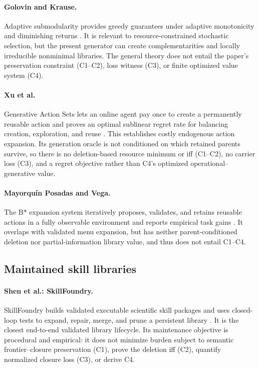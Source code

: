 \paragraph{Golovin and Krause.}
Adaptive submodularity provides greedy guarantees under adaptive monotonicity
and diminishing returns \cite{GolovinKrause2011}.  It is relevant to
resource-constrained stochastic selection, but the present generator can
create complementarities and locally irreducible nonminimal libraries.  The
general theory does not entail the paper's preservation constraint (C1--C2),
loss witness (C3), or finite optimized value system (C4).

\paragraph{Xu et al.}
Generative Action Sets lets an online agent pay once to create a permanently
reusable action and proves an optimal sublinear regret rate for balancing
creation, exploration, and reuse \cite{XuEtAl2026GenerativeActions}.  This
establishes costly endogenous action expansion.  Its generation oracle is not
conditioned on which retained parents survive, so there is no deletion-based
resource minimum or iff (C1--C2), no carrier loss (C3), and a regret objective
rather than C4's optimized operational--generative value.

\paragraph{Mayorqu\'in Posadas and Vega.}
The B* expansion system iteratively proposes, validates, and retains reusable
actions in a fully observable environment and reports empirical task gains
\cite{MayorquinPosadasVega2026}.  It overlaps with validated menu expansion,
but has neither parent-conditioned deletion nor partial-information library
value, and thus does not entail C1--C4.

\subsection{Maintained skill libraries}

\paragraph{Shen et al.: SkillFoundry.}
SkillFoundry builds validated executable scientific skill packages and uses
closed-loop tests to expand, repair, merge, and prune a persistent library
\cite{ShenEtAl2026SkillFoundry}.  It is the closest end-to-end validated
library lifecycle.  Its maintenance objective is procedural and empirical:
it does not minimize burden subject to semantic frontier--closure preservation
(C1), prove the deletion iff (C2), quantify normalized closure loss (C3), or
derive C4.

